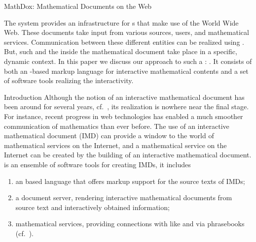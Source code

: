 
\begin{omgroup}[id=mathdox2,short=MathDox,creators={amc,cuypers,barreiro}]
                        {MathDox: Mathematical Documents on the Web}

\renewcommand{\CAS}{\indextoo{CAS}}


The {\MathDox} system provides an infrastructure for
{s} that make use of the World Wide Web.
These documents take input from various sources, users, and mathematical services.
Communication between these different entities can be realized using {\openmath}.  But,
such {} and the {} inside the mathematical
document take place in a specific, dynamic context. In this paper we discuss our approach
to such a {}: {\MathDox}.  It consists of both an
{\xml}-based markup language for interactive mathematical contents and a set of software
tools realizing the interactivity.

\begin{omgroup}{Introduction}
Although the notion of an interactive mathematical document has been around for several
years, cf.~\cite{CohMee:tapap98}, its realization is nowhere near the final stage. For
instance, recent progress in web technologies has enabled a much smoother communication of
mathematics than ever before. The use of an interactive mathematical document (IMD) can
provide a window to the world of mathematical services on the Internet, and a mathematical
service on the Internet can be created by the building of an interactive mathematical
document.  {\MathDox} is an ensemble of software tools for creating IMDs, it includes
\begin{enumerate}
\item an {\xml} based language that offers markup support for the source texts of IMDs;
\item a document server, rendering interactive mathematical documents from source text and
  interactively obtained information;
\item mathematical services, providing connections with {\CAS{s}} like {\mathematica} and
  {\gap} via {\openmath} phrasebooks (cf.~\cite{URL:omsoc}).
\end{enumerate}


\end{omgroup}
\end{omgroup}
